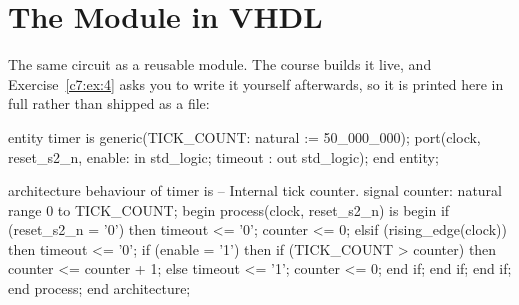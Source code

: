 \section{The  Module in VHDL}
\label{c7:a3}
The same circuit as a reusable module. The course builds it live, and Exercise~\ref{c7:ex:4} asks
you to write it yourself afterwards, so it is printed here in full rather than shipped as a file:

\begin{vhdlcode}
entity timer is
    generic(TICK_COUNT: natural := 50_000_000);
    port(clock, reset_s2_n, enable: in std_logic;
         timeout                  : out std_logic);
end entity;

architecture behaviour of timer is
-- Internal tick counter.
signal counter: natural range 0 to TICK_COUNT;
begin
    process(clock, reset_s2_n) is
    begin
        if (reset_s2_n = '0') then
            timeout <= '0';
            counter <= 0;
        elsif (rising_edge(clock)) then
            timeout <= '0';
            if (enable = '1') then
                if (TICK_COUNT > counter) then
                    counter <= counter + 1;
                else
                    timeout <= '1';
                    counter <= 0;
                end if;
            end if;
        end if;
    end process;
end architecture;
\end{vhdlcode}

